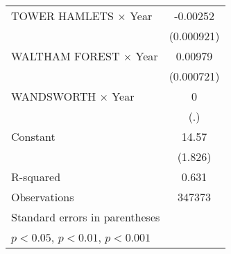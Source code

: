 {\begin{longtable}{l*{1}{c}}
\addlinespace
TOWER HAMLETS $\times$ Year&    -0.00252\sym{**} \\
                    &  (0.000921)         \\
\addlinespace
WALTHAM FOREST $\times$ Year&     0.00979\sym{***}\\
                    &  (0.000721)         \\
\addlinespace
WANDSWORTH $\times$ Year&           0         \\
                    &         (.)         \\
\addlinespace
Constant            &       14.57\sym{***}\\
                    &     (1.826)         \\
\midrule
R-squared           &       0.631         \\
Observations        &      347373         \\
\bottomrule
\multicolumn{2}{l}{\footnotesize Standard errors in parentheses}\\
\multicolumn{2}{l}{\footnotesize \sym{*} \(p<0.05\), \sym{**} \(p<0.01\), \sym{***} \(p<0.001\)}\\
\end{longtable}
}

